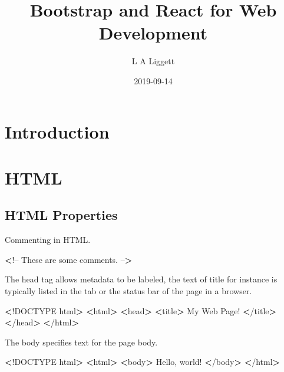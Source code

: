 \documentclass[]{book}
\title{Bootstrap and React for Web Development}
\author{L A Liggett}
\date{2019-09-14}
\newenvironment{Shaded}{\begin{snugshade}}{\end{snugshade}}
\newcommand{\FunctionTok}[1]{\textcolor[rgb]{0.00,0.00,0.00}{#1}}
\newcommand{\OperatorTok}[1]{\textcolor[rgb]{0.81,0.36,0.00}{\textbf{#1}}}
\newcommand{\ExtensionTok}[1]{#1}
\newcommand{\NormalTok}[1]{#1}
\begin{document}
\maketitle

{
\setcounter{tocdepth}{1}
\tableofcontents
}
\chapter{Introduction}\label{introduction}

\chapter{HTML}\label{html}

\section{HTML Properties}\label{html-properties}

Commenting in HTML.

\begin{Shaded}
\begin{Highlighting}[]
\OperatorTok{<}\NormalTok{!}\ExtensionTok{--}
\ExtensionTok{These}\NormalTok{ are some comments.}
\ExtensionTok{--}\OperatorTok{>}
\end{Highlighting}
\end{Shaded}

The head tag allows metadata to be labeled, the text of title for
instance is typically listed in the tab or the status bar of the page in
a browser.

\begin{Shaded}
\begin{Highlighting}[]
\OperatorTok{<}\NormalTok{!}\ExtensionTok{DOCTYPE}\NormalTok{ html}\OperatorTok{>}         
\OperatorTok{<}\ExtensionTok{html}\OperatorTok{>}                  
    \OperatorTok{<}\FunctionTok{head}\OperatorTok{>}              
        \OperatorTok{<}\ExtensionTok{title}\OperatorTok{>}         
            \ExtensionTok{My}\NormalTok{ Web Page!}
        \OperatorTok{<}\NormalTok{/}\ExtensionTok{title}\OperatorTok{>}        
    \OperatorTok{<}\NormalTok{/}\ExtensionTok{head}\OperatorTok{>}             
\OperatorTok{<}\NormalTok{/}\ExtensionTok{html}\OperatorTok{>}                 
\end{Highlighting}
\end{Shaded}

The body specifies text for the page body.

\begin{Shaded}
\begin{Highlighting}[]
\OperatorTok{<}\NormalTok{!}\ExtensionTok{DOCTYPE}\NormalTok{ html}\OperatorTok{>}         
\OperatorTok{<}\ExtensionTok{html}\OperatorTok{>}                  
    \OperatorTok{<}\ExtensionTok{body}\OperatorTok{>}              
        \ExtensionTok{Hello}\NormalTok{, world!   }
    \OperatorTok{<}\NormalTok{/}\ExtensionTok{body}\OperatorTok{>}             
\OperatorTok{<}\NormalTok{/}\ExtensionTok{html}\OperatorTok{>}                 
\end{Highlighting}
\end{Shaded}
\end{document}
